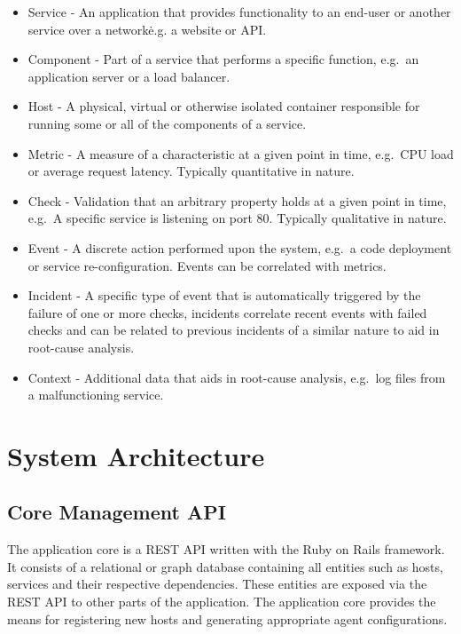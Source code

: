 \documentclass{cshonours}
\begin{document}
\begin{itemize}
  \item Service - An application that provides functionality to an end-user or another service over a network\. e.g. a website or API.
  \item Component - Part of a service that performs a specific function, e.g.\ an application server or a load balancer.
  \item Host - A physical, virtual or otherwise isolated container responsible for running some or all of the components of a service.
  \item Metric - A measure of a characteristic at a given point in time, e.g.\ CPU load or average request latency. Typically quantitative in nature.
  \item Check - Validation that an arbitrary property holds at a given point in time, e.g.\ A specific service is listening on port 80. Typically qualitative in nature.
  \item Event - A discrete action performed upon the system, e.g.\ a code deployment or service re-configuration. Events can be correlated with metrics.
  \item Incident - A specific type of event that is automatically triggered by the failure of one or more checks, incidents correlate recent events with failed checks and can be related to previous incidents of a similar nature to aid in root-cause analysis.
  \item Context - Additional data that aids in root-cause analysis, e.g.\ log files from a malfunctioning service.
\end{itemize}

\pagebreak
\section{System Architecture}
\label{section:architecture}

\subsection{Core Management API}

The application core is a REST API written with the Ruby on Rails framework. It consists of a relational or graph database containing all entities such as hosts, services and their respective dependencies. These entities are exposed via the REST API to other parts of the application. The application core provides the means for registering new hosts and generating appropriate agent configurations.
\end{document}
